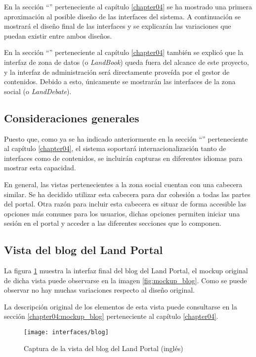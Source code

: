 En la sección ``'' perteneciente al capítulo \ref{chapter04} se ha mostrado una primera aproximación al posible diseño de las interfaces del sistema.  A continuación se mostrará el diseño final de las interfaces y se explicarán las variaciones que puedan existir entre ambos diseños.

En la sección ``'' perteneciente al capítulo \ref{chapter04} también se explicó que la interfaz de zona de datos (o \textit{LandBook}) queda fuera del alcance de este proyecto, y la interfaz de administración será directamente proveída por el gestor de contenidos.  Debido a esto, únicamente se mostrarán las interfaces de la zona social (o \textit{LandDebate}).

\subsection{Consideraciones generales}
Puesto que, como ya se ha indicado anteriormente en la sección ``'' perteneciente al capítulo \ref{chapter04}, el sistema soportará internacionalización tanto de interfaces como de contenidos, se incluirán capturas en diferentes idiomas para mostrar esta capacidad.

En general, las vistas pertenecientes a la zona social cuentan con una cabecera similar.  Se ha decidido utilizar esta cabecera para dar cohesión a todas las partes del portal.  Otra razón para incluir esta cabecera es situar de forma accesible las opciones más comunes para los usuarios, dichas opciones permiten iniciar una sesión en el portal y acceder a las diferentes secciones que lo componen.


\subsection{Vista del blog del Land Portal}
La figura \ref{fig:interface_blog} muestra la interfaz final del blog del Land Portal, el mockup original de dicha vista puede observarse en la imagen \ref{fig:mockup_blog}.  Como se puede observar no hay muchas variaciones respecto al diseño original.  

La descripción original de los elementos de esta vista puede consultarse en la sección \ref{chapter04:mockup_blog} perteneciente al capítulo \ref{chapter04}.

\begin{figure}[h]
	\centering
	\texttt{[image: interfaces/blog]}
	\caption{Captura de la vista del blog del Land Portal (inglés)}
	\label{fig:interface_blog}
\end{figure}

